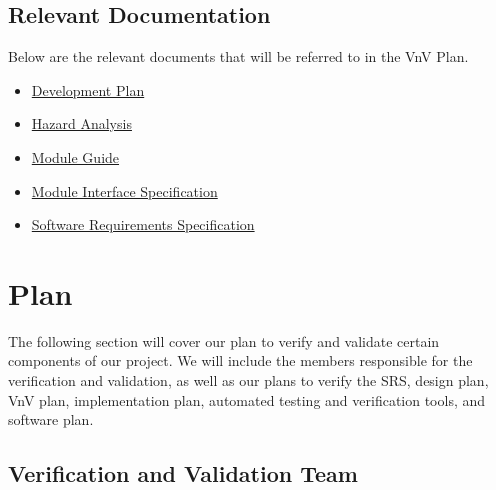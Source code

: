 \documentclass[12pt, titlepage]{article}
\begin{document}
\subsection{Relevant Documentation}

Below are the relevant documents that will be referred to in the VnV Plan.

\begin{itemize}
	\item \href{https://github.com/arkinmodi/project-sayyara/blob/main/docs/DevelopmentPlan/DevelopmentPlan.pdf}{Development Plan \citep*{DevPlan}}
	\item \href{https://github.com/arkinmodi/project-sayyara/blob/main/docs/HazardAnalysis/HazardAnalysis.pdf}{Hazard Analysis \citep*{HA}}
	\item \href{https://github.com/arkinmodi/project-sayyara/blob/main/docs/Design/MG/MG.pdf}{Module Guide \citep*{MG}}
	\item \href{https://github.com/arkinmodi/project-sayyara/blob/main/docs/Design/MIS/MIS.pdf}{Module Interface Specification \citep*{MIS}}
	\item \href{https://github.com/arkinmodi/project-sayyara/blob/main/docs/SRS/SRS.pdf}{Software Requirements Specification \citep*{SRS}}
\end{itemize}


\section{Plan}

The following section will cover our plan to verify and validate certain components of our project.
We will include the members responsible for the verification and validation, as well as our plans
to verify the SRS, design plan, VnV plan, implementation plan, automated testing and verification
tools, and software plan.


\subsection{Verification and Validation Team}
\end{document}
